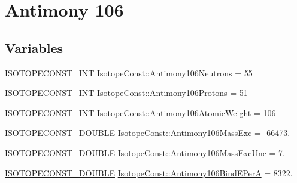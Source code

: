 \hypertarget{group___isotope_const-_antimony-_sb106}{}\section{Antimony 106}
\label{group___isotope_const-_antimony-_sb106}
\subsection*{Variables}
\begin{DoxyCompactItemize}
\item 
\mbox{\hyperlink{group___isotope_const-_macros_ga5f18360b3e99483a35c32d789e62621c}{I\+S\+O\+T\+O\+P\+E\+C\+O\+N\+S\+T\+\_\+\+I\+NT}} \mbox{\hyperlink{group___isotope_const-_antimony-_sb106_gaf44fa0c285cda8fc46fbfe002dd03cb5}{Isotope\+Const\+::\+Antimony106\+Neutrons}} = 55
\item 
\mbox{\hyperlink{group___isotope_const-_macros_ga5f18360b3e99483a35c32d789e62621c}{I\+S\+O\+T\+O\+P\+E\+C\+O\+N\+S\+T\+\_\+\+I\+NT}} \mbox{\hyperlink{group___isotope_const-_antimony-_sb106_ga0d1ba6ab614f4b5ec115a51929f3cd33}{Isotope\+Const\+::\+Antimony106\+Protons}} = 51
\item 
\mbox{\hyperlink{group___isotope_const-_macros_ga5f18360b3e99483a35c32d789e62621c}{I\+S\+O\+T\+O\+P\+E\+C\+O\+N\+S\+T\+\_\+\+I\+NT}} \mbox{\hyperlink{group___isotope_const-_antimony-_sb106_gadab24bcf1d74dde9eb0d8c7fe0b52dea}{Isotope\+Const\+::\+Antimony106\+Atomic\+Weight}} = 106
\item 
\mbox{\hyperlink{group___isotope_const-_macros_ga8f45a7272ce02c0b4c65c44636ed719a}{I\+S\+O\+T\+O\+P\+E\+C\+O\+N\+S\+T\+\_\+\+D\+O\+U\+B\+LE}} \mbox{\hyperlink{group___isotope_const-_antimony-_sb106_gafcbf9d06cbb157f60afea73b471471d5}{Isotope\+Const\+::\+Antimony106\+Mass\+Exc}} = -\/66473.
\item 
\mbox{\hyperlink{group___isotope_const-_macros_ga8f45a7272ce02c0b4c65c44636ed719a}{I\+S\+O\+T\+O\+P\+E\+C\+O\+N\+S\+T\+\_\+\+D\+O\+U\+B\+LE}} \mbox{\hyperlink{group___isotope_const-_antimony-_sb106_ga446904d2ef3d36702e45bc381988d8bd}{Isotope\+Const\+::\+Antimony106\+Mass\+Exc\+Unc}} = 7.
\item 
\mbox{\hyperlink{group___isotope_const-_macros_ga8f45a7272ce02c0b4c65c44636ed719a}{I\+S\+O\+T\+O\+P\+E\+C\+O\+N\+S\+T\+\_\+\+D\+O\+U\+B\+LE}} \mbox{\hyperlink{group___isotope_const-_antimony-_sb106_gaa5c5102cb5f62c7b71998256903fbbe7}{Isotope\+Const\+::\+Antimony106\+Bind\+E\+PerA}} = 8322.
\item 

\end{DoxyCompactItemize}
